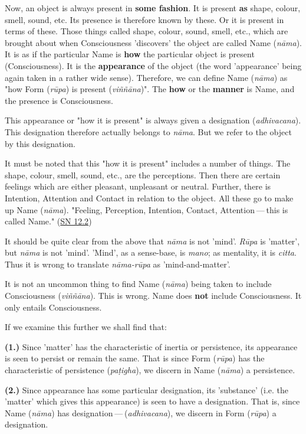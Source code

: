 Now, an object is always present in \textbf{some fashion}. It is present \textbf{as}
shape, colour, smell, sound, etc. Its presence is therefore known by
these. Or it is present in terms of these. Those things called shape,
colour, sound, smell, etc., which are brought about when Consciousness
'discovers' the object are called Name (\emph{nāma}). It is as if the
particular Name is \textbf{how} the particular object is present
(Consciousness). It is the \textbf{appearance} of the object (the word
'appearance' being again taken in a rather wide sense). Therefore, we
can define Name (\emph{nāma}) as "how Form (\emph{rūpa}) is present
(\emph{viññāna})". The \textbf{how} or the \textbf{manner} is Name, and the presence is
Consciousness.


This appearance or "how it is present" is always given a designation
(\emph{adhivacana}). This designation therefore actually belongs to
\emph{nāma}. But we refer to the object by this designation.


It must be noted that this "how it is present" includes a number of
things. The shape, colour, smell, sound, etc., are the perceptions. Then
there are certain feelings which are either pleasant, unpleasant or
neutral. Further, there is Intention, Attention and Contact in relation
to the object. All these go to make up Name (\emph{nāma}). "Feeling,
Perception, Intention, Contact, Attention — this is called
Name." (\href{https://suttacentral.net/sn12.2/en/bodhi}{SN 12.2})


It should be quite clear from the above that \emph{nāma} is not 'mind'.
\emph{Rūpa} is 'matter', but \emph{nāma} is not 'mind'. 'Mind', as a sense-base,
is \emph{mano}; as mentality, it is \emph{citta}. Thus it is wrong to
translate \emph{nāma-rūpa} as 'mind-and-matter'.


It is not an uncommon thing to find Name (\emph{nāma}) being taken to
include Consciousness (\emph{viññāna}). This is wrong. Name does \textbf{not}
include Consciousness. It only entails Consciousness.


If we examine this further we shall find that:


\textbf{(1.)} Since 'matter' has the characteristic of inertia or persistence, its
appearance is seen to persist or remain the same. That is since Form
(\emph{rūpa}) has the characteristic of persistence (\emph{paṭigha}), we
discern in Name (\emph{nāma}) a persistence.


\textbf{(2.)} Since appearance has some particular designation, its 'substance'
(i.e. the 'matter' which gives this appearance) is seen to have a
designation. That is, since Name (\emph{nāma}) has designation — (\emph{adhivacana}), we discern in Form (\emph{rūpa}) a designation.


